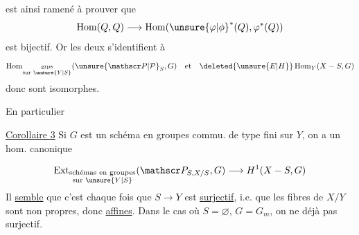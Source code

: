 est ainsi ramené à prouver que
\[
\operatorname{Hom}(Q,Q)\longrightarrow\operatorname{Hom}({\unsure{\varphi|\phi}}^*(Q),\varphi^*(Q))
\]
est bijectif. Or les deux s’identifient {} à
\[
\operatorname{Hom}_{\substack{\text{grps}\\\text{sur }{\unsure{Y|S}}}}({\unsure{\mathscr P|\mathcal P}}_S,G)
\quad\text{et}\quad
\deleted{{\unsure{E|H}}}\operatorname{Hom}_Y(X-S,G)
\]
donc sont isomorphes.

En particulier

\noindent\vrule\hspace{.6em}\begin{minipage}{.93\linewidth}
\uline{Corollaire 3} Si $G$ est un schéma en groupes commu. de type fini sur $Y$, on a un hom. canonique 
\end{minipage}\par
\[
\operatorname{Ext}_{\substack{\text{schémas en groupes}\\\text{sur }{\unsure{Y|S}}}}(\mathscr P_{S,X/S},G)\longrightarrow H^1(X-S,G)
\]
Il \uline{semble} que c’est \uline{{}} chaque fois que $S\longrightarrow Y$ est \uline{surjectif}, i.e. que les fibres de $X/Y$ sont non propres, donc \uline{affines}. Dans le cas où $S=\varnothing$, $G=G_m$, on ne {} déjà pas surjectif.
